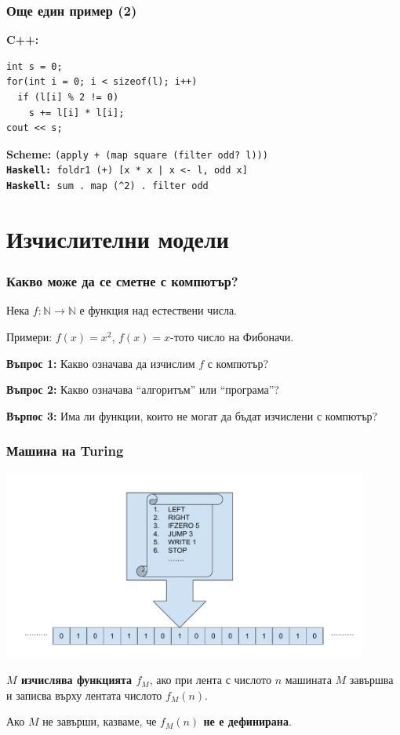 \documentclass{beamer}
\begin{document}
\begin{frame}[fragile]
  \frametitle{Още един пример (2)}
  \textbf{C++:}
\begin{verbatim}
int s = 0;
for(int i = 0; i < sizeof(l); i++)
  if (l[i] % 2 != 0)
    s += l[i] * l[i];
cout << s;
\end{verbatim}
  \pause
  \textbf{Scheme:} \tt{(apply + (map square (filter odd? l)))}\\[1em]
  \pause
  \textbf{Haskell:} \tt{foldr1 (+) [x * x | x <- l, odd x]}\\[1em]
  \pause
  \textbf{Haskell:} \tt{sum . map (\^{}2) . filter odd}


\end{frame}

\section*{Изчислителни модели}

\begin{frame}
  \frametitle{Какво може да се сметне с компютър?}

  Нека $f:\mathbb N\to\mathbb N$ е функция над естествени числа.

  Примери: $f(x) = x^2$, $f(x) = x$-тото число на Фибоначи.
  \vspace{2em}
  \pause

  \textbf{Въпрос 1:} Какво означава да изчислим $f$ с компютър?
  \vspace{2em}
  \pause

  \textbf{Въпрос 2:} Какво означава ``алгоритъм'' или ``програма''?
  \vspace{2em}

  \pause

  \textbf{Върпос 3:} Има ли функции, които не могат да бъдат изчислени с компютър?
\end{frame}

\begin{frame}
  \frametitle{Машина на Turing}

  \includegraphics[width=0.9\textwidth]{images/turing.pdf}

  \pause
  \textbf{$M$ изчислява функцията $f_M$}, ако при лента с числото $n$ машината $M$ завършва и записва върху лентата числото $f_M(n)$.

  \pause
  Ако $M$ не завърши, казваме, че \textbf{$f_M(n)$ не е дефинирана}.
\end{frame}
\end{document}
